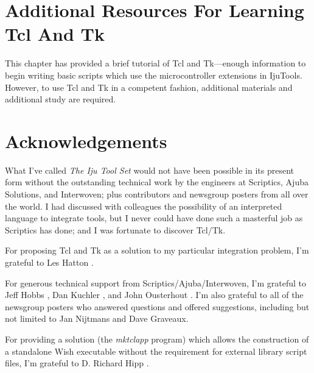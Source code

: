 \section{Additional Resources For Learning Tcl And Tk}

This chapter has provided a brief tutorial of Tcl and Tk---enough
information to begin writing basic scripts which use the microcontroller
extensions in IjuTools.  However, to use Tcl and Tk in a competent
fashion, additional materials and additional study are required.




\section{Acknowledgements}

What I've called \emph{The Iju Tool Set} would not have been possible in
its present form without the outstanding technical work by the engineers
at Scriptics, Ajuba Solutions, and Interwoven; plus contributors and
newsgroup posters from all over the world.  I had discussed with colleagues
the possibility of an interpreted language to integrate tools, but I never
could have done such a masterful job as Scriptics has done; and I was fortunate
to discover Tcl/Tk.

For proposing Tcl and Tk as a solution to my particular integration
problem, I'm grateful to Les Hatton \cite{bibref:i:leshatton}.  

For generous
technical support from Scriptics/Ajuba/Interwoven, I'm grateful to 
Jeff Hobbs \cite{bibref:i:jeffreyhobbs}, Dan Kuchler \cite{bibref:i:dankuchler}, 
and John Ousterhout \cite{bibref:i:johnousterhout}.
I'm also grateful to all of the newsgroup posters who 
answered questions and offered suggestions, including
but not limited to Jan Nijtmans and Dave Graveaux.

For providing a solution (the \emph{mktclapp} program) which allows
the construction of a standalone Wish executable without the
requirement for external library script files, I'm grateful to
D. Richard Hipp \cite{bibref:i:drichardhipp}.

